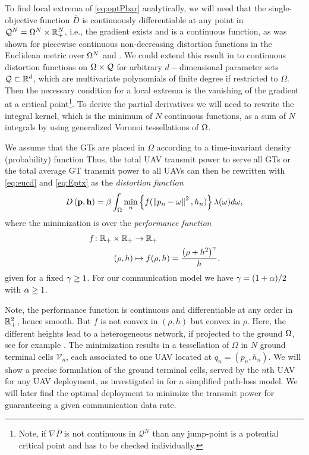 \documentclass[smallabstract,smallcaptions]{dccpaper}
\newcommand{\disfunction}{distortion function}
\newcounter{example}[section]
\newcommand{\df}{\ensuremath{\lam}}         %
\newcommand{\bP}{\ensuremath{\vp}}          %
\newcommand{\bH}{\ensuremath{\vh}}          %
\newcommand{\Pbar}{\ensuremath{\bar{P}}}         %
\newcommand{\Vor}{\ensuremath{\mathcal{V}}}         %
\newcommand{\Qset}{\ensuremath{\mathcal Q}}
\newcommand{\Dis}{\ensuremath{D}}                    %
\newcommand{\AvDis}{\ensuremath{\bar{\Dis}}}         %
\begin{document}
To find local extrema of \eqref{eq:optPbar} analytically, we will need that the single-objective function $\AvDis$ is
continuously differentiable at any point in $\Qset^N=\Omega^N\times \R_+^N$, i.e., the gradient exists and is a
continuous function, as was shown for piecewise continuous non-decreasing distortion functions in the Euclidean metric
over $\Omega^N$ \cite[Thm.2.2]{CMB05} and \cite{GJ}. We could extend this result in \cite{WJ18} to continuous
\disfunction s on $\Ome\times\Qset$ for arbitrary $d-$dimensional parameter sets $\Qset\subset \R^d$, which are
multivariate polynomials of finite degree if restricted to $\Omega$.  Then the necessary condition for a local extrema
is the vanishing of the gradient at a critical point\footnote{Note, if $\nabla \Pbar$ is not continuous in $\Qset^N$
than any jump-point is a potential critical point and has to be checked individually.}.  To derive the partial
derivatives we will need to rewrite the integral kernel, which is the minimum of $N$ continuous functions, as a sum of
$N$ integrals by using  generalized Voronoi tessellations of $\Omega$.
%





We assume that the GTs  are placed in $\Omega$ according to a time-invariant density (probability) function
  Thus, the total
UAV transmit power to serve all GTs or the total average GT transmit power to all UAVs can then be rewritten with
\eqref{eq:eucd} and \eqref{eq:Eptx} as the \emph{distortion function}
%
\begin{equation}
  D\left(\bP,\bH\right)=\bet\int_{\Omega}\min_{n} \left\{ f(\Norm{p_n-\ome}^2,h_n) \right\} \df(\omega)d\omega,
 \label{obj0}
\end{equation}
%
where the minimization is over the \emph{performance function}
%
\begin{align}
 f \colon {\ensuremath{\mathbb R}}_+\times {\ensuremath{\mathbb R}}_+ &\to {\ensuremath{\mathbb R}}_+\\
           (\rho,h)&\mapsto f(\rho,h)=\frac{\left(\rho+h^2\right)^{\gamma}}{h}.
\end{align}
%
given for a fixed $\gamma\geq 1$. For our communication model we have $\gamma=(1+\alpha)/2$ with $\alpha\geq 1$.

Note, the performance function is continuous and differentiable at any order in ${\mathbb R}^2_+$, hence smooth. But $f$ is not
convex in $(\rho,h)$ but convex in $\rho$. 
Here, the different heights lead to a heterogeneous network, if projected to the ground $\Omega$, see for example
\cite{GJ16a}.  The minimization results in a tessellation of $\Omega$ in $N$ ground terminal cells $\Vor_n$, each
associated to one UAV located at $q_n=(p_n,h_n)$.  We will show a precise formulation of the ground terminal cells,
served by the $n$th UAV for any UAV deployment, as investigated in \cite{MSBD16b} for a simplified path-loss model. We
will later find the optimal deployment to minimize the transmit power for guaranteeing a given communication data rate.
%
\fi
\end{document}
